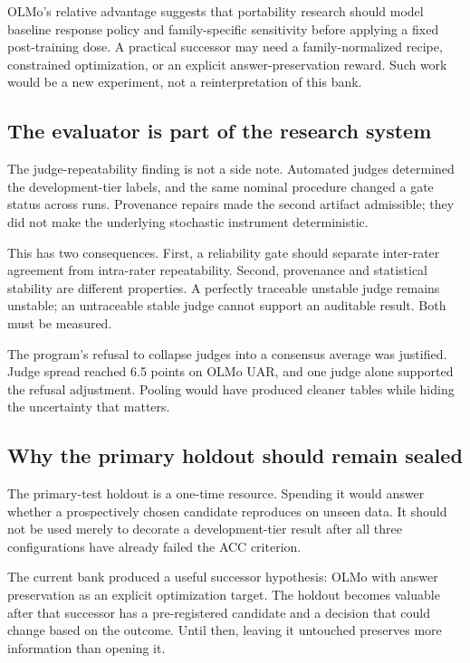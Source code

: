 \documentclass[9pt,letterpaper,twocolumn]{extarticle}
\begin{document}
OLMo's relative advantage suggests that portability research should
model baseline response policy and family-specific sensitivity before
applying a fixed post-training dose. A practical successor may need a
family-normalized recipe, constrained optimization, or an explicit
answer-preservation reward. Such work would be a new experiment, not a
reinterpretation of this bank.

\subsection{The evaluator is part of the research
system}\label{the-evaluator-is-part-of-the-research-system}

The judge-repeatability finding is not a side note. Automated judges
determined the development-tier labels, and the same nominal procedure
changed a gate status across runs. Provenance repairs made the second
artifact admissible; they did not make the underlying stochastic
instrument deterministic.

This has two consequences. First, a reliability gate should separate
inter-rater agreement from intra-rater repeatability. Second, provenance
and statistical stability are different properties. A perfectly
traceable unstable judge remains unstable; an untraceable stable judge
cannot support an auditable result. Both must be measured.

The program's refusal to collapse judges into a consensus average was
justified. Judge spread reached 6.5 points on OLMo UAR, and one judge
alone supported the refusal adjustment. Pooling would have produced
cleaner tables while hiding the uncertainty that matters.

\subsection{Why the primary holdout should remain
sealed}\label{why-the-primary-holdout-should-remain-sealed}

The primary-test holdout is a one-time resource. Spending it would
answer whether a prospectively chosen candidate reproduces on unseen
data. It should not be used merely to decorate a development-tier result
after all three configurations have already failed the ACC criterion.

The current bank produced a useful successor hypothesis: OLMo with
answer preservation as an explicit optimization target. The holdout
becomes valuable after that successor has a pre-registered candidate and
a decision that could change based on the outcome. Until then, leaving
it untouched preserves more information than opening it.
\end{document}
